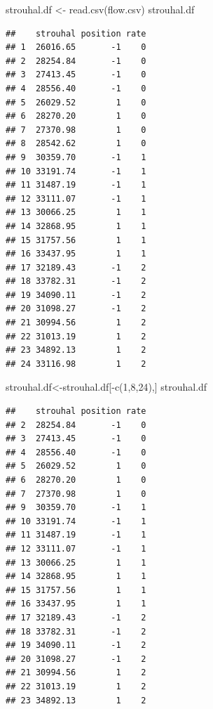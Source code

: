 \documentclass[
]{book}
\newenvironment{Shaded}{\begin{snugshade}}{\end{snugshade}}
\newcommand{\DecValTok}[1]{\textcolor[rgb]{0.00,0.00,0.81}{#1}}
\newcommand{\FunctionTok}[1]{\textcolor[rgb]{0.00,0.00,0.00}{#1}}
\newcommand{\NormalTok}[1]{#1}
\newcommand{\OtherTok}[1]{\textcolor[rgb]{0.56,0.35,0.01}{#1}}
\newcommand{\SpecialCharTok}[1]{\textcolor[rgb]{0.00,0.00,0.00}{#1}}
\newcommand{\StringTok}[1]{\textcolor[rgb]{0.31,0.60,0.02}{#1}}
\begin{document}
\begin{Shaded}
\begin{Highlighting}[]
\NormalTok{strouhal.df }\OtherTok{\textless{}{-}} \FunctionTok{read.csv}\NormalTok{(}\StringTok{\textquotesingle{}flow.csv\textquotesingle{}}\NormalTok{)}
\NormalTok{strouhal.df}
\end{Highlighting}
\end{Shaded}

\begin{verbatim}
##    strouhal position rate
## 1  26016.65       -1    0
## 2  28254.84       -1    0
## 3  27413.45       -1    0
## 4  28556.40       -1    0
## 5  26029.52        1    0
## 6  28270.20        1    0
## 7  27370.98        1    0
## 8  28542.62        1    0
## 9  30359.70       -1    1
## 10 33191.74       -1    1
## 11 31487.19       -1    1
## 12 33111.07       -1    1
## 13 30066.25        1    1
## 14 32868.95        1    1
## 15 31757.56        1    1
## 16 33437.95        1    1
## 17 32189.43       -1    2
## 18 33782.31       -1    2
## 19 34090.11       -1    2
## 20 31098.27       -1    2
## 21 30994.56        1    2
## 22 31013.19        1    2
## 23 34892.13        1    2
## 24 33116.98        1    2
\end{verbatim}

\begin{Shaded}
\begin{Highlighting}[]
\NormalTok{strouhal.df}\OtherTok{\textless{}{-}}\NormalTok{strouhal.df[}\SpecialCharTok{{-}}\FunctionTok{c}\NormalTok{(}\DecValTok{1}\NormalTok{,}\DecValTok{8}\NormalTok{,}\DecValTok{24}\NormalTok{),]}
\NormalTok{strouhal.df}
\end{Highlighting}
\end{Shaded}

\begin{verbatim}
##    strouhal position rate
## 2  28254.84       -1    0
## 3  27413.45       -1    0
## 4  28556.40       -1    0
## 5  26029.52        1    0
## 6  28270.20        1    0
## 7  27370.98        1    0
## 9  30359.70       -1    1
## 10 33191.74       -1    1
## 11 31487.19       -1    1
## 12 33111.07       -1    1
## 13 30066.25        1    1
## 14 32868.95        1    1
## 15 31757.56        1    1
## 16 33437.95        1    1
## 17 32189.43       -1    2
## 18 33782.31       -1    2
## 19 34090.11       -1    2
## 20 31098.27       -1    2
## 21 30994.56        1    2
## 22 31013.19        1    2
## 23 34892.13        1    2
\end{verbatim}
\end{document}
